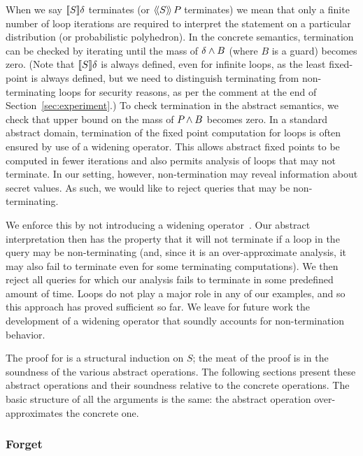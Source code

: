 When we say $ [\![{S}]\!]{\delta} $ terminates (or $
\langle\!\langle{S}\rangle\!\rangle\,{P_{}} $ terminates) we mean that only a finite number
of loop iterations are required to interpret the statement on a
particular distribution (or probabilistic polyhedron). In the concrete
semantics, termination can be checked by iterating until the mass of $
\delta \wedge B $ (where $ B $ is a guard) becomes zero. (Note that
$ [\![{S}]\!]{\delta} $ is always defined, even for infinite loops, as
the least fixed-point is always defined, but we need to distinguish
terminating from non-terminating loops for security reasons, as per
the comment at the end of Section~\ref{sec:experiment}.) 
To check termination in the
abstract semantics, we check that upper bound on the mass of $
P_{} \wedge B $ becomes zero. 
%
In a standard abstract domain, termination of the
fixed point computation for loops is often ensured by use of a widening
operator.  This allows abstract fixed points to be computed in fewer
iterations and also permits analysis of loops that may not terminate.
In our setting, however, non-termination may reveal information about secret
values.  As such, we would like to reject queries that may be non-terminating.

We enforce this by not introducing a widening
operator~\cite{CousotHalbwachs78-POPL,cortesi08widening}.  Our abstract
interpretation then has the property that it will not terminate if a
loop in the query may be non-terminating (and, since it is an
over-approximate analysis, it may also fail to terminate even for some
terminating computations).  We then reject all queries for which our
analysis fails to terminate in some predefined amount of time.  Loops
do not play a major role in any of our examples, and so this approach
has proved sufficient so far.  We leave for future work the
development of a widening operator that soundly accounts for
non-termination behavior.


The proof for  is a structural induction on $ S
$; the meat of the proof is in the soundness of the various abstract
operations. The following sections present these abstract
operations and their soundness relative to the concrete
operations. The basic structure of all the arguments is the same: the
abstract operation over-approximates the concrete one.

\subsubsection{Forget} \label{sec:forget}

